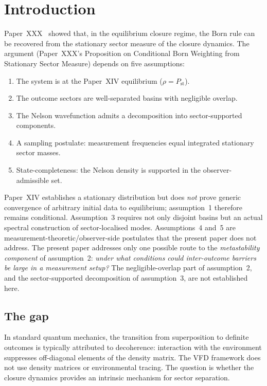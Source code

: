 \documentclass[12pt]{article}
\newcommand{\Pst}{P_{\mathrm{st}}}
\begin{document}
\section{Introduction}\label{sec:intro}

Paper~XXX~\citep{SmartXXX} showed that, in the equilibrium closure regime, the Born rule can be recovered from the stationary sector measure of the closure dynamics. The argument (Paper~XXX's Proposition on Conditional Born Weighting from Stationary Sector Measure) depends on five assumptions:

\begin{enumerate}
    \item The system is at the Paper~XIV equilibrium ($\rho = \Pst$).
    \item The outcome sectors are well-separated basins with negligible overlap.
    \item The Nelson wavefunction admits a decomposition into sector-supported components.
    \item A sampling postulate: measurement frequencies equal integrated stationary sector masses.
    \item State-completeness: the Nelson density is supported in the observer-admissible set.
\end{enumerate}

Paper~XIV establishes a stationary distribution but does \emph{not} prove generic convergence of arbitrary initial data to equilibrium; assumption~1 therefore remains conditional. Assumption~3 requires not only disjoint basins but an actual spectral construction of sector-localised modes. Assumptions~4 and~5 are measurement-theoretic/observer-side postulates that the present paper does not address. The present paper addresses only one possible route to the \emph{metastability component} of assumption~2: \textit{under what conditions could inter-outcome barriers be large in a measurement setup?} The negligible-overlap part of assumption~2, and the sector-supported decomposition of assumption~3, are not established here.

\subsection*{The gap}

In standard quantum mechanics, the transition from superposition to definite outcomes is typically attributed to decoherence: interaction with the environment suppresses off-diagonal elements of the density matrix. The VFD framework does not use density matrices or environmental tracing. The question is whether the closure dynamics provides an intrinsic mechanism for sector separation.
\end{document}
